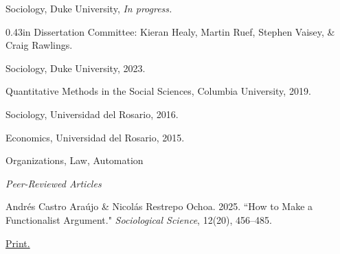 \documentclass[11pt,article,oneside]{memoir}
\begin{document}
\bigskip


\reversemarginpar

\bigskip



\ind {} Sociology, Duke University, \emph{In progress.} \par

\ind
{%
   0.43in \dimexpr\linewidth-0.43in\relax
  \footnotesize
  Dissertation Committee: Kieran Healy, Martin Ruef, Stephen Vaisey,
  \& Craig Rawlings.
  \normalsize\par
}

\ind {} Sociology, Duke University, 2023. \par

\ind {} Quantitative Methods in the Social Sciences, Columbia University, 2019. \par

\ind {} Sociology, Universidad del Rosario, 2016. \par

\ind {} Economics, Universidad del Rosario, 2015. \par

\bigskip

\medskip

\noindent Organizations, Law, Automation

\bigskip

 
\medskip

\ind \emph{Peer-Reviewed Articles}\par \vspace{0.075in}


\ind \normalsize \colorbox{Gray!15}{Andrés Castro Araújo} \& Nicolás Restrepo Ochoa. 2025. ``How to Make a Functionalist Argument." \emph{Sociological Science}, 12(20), 456–485. \par
\ind \hspace{0.35in} \footnotesize \href{http://dx.doi.org/10.15195/v12.a20}{Print.} \vspace{0.05in}
\end{document}
